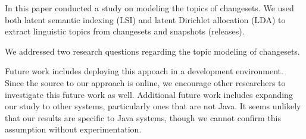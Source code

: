 
In this paper conducted a study on modeling the topics of changesets.
We used both latent semantic indexing (LSI) and latent Dirichlet
allocation (LDA) to extract linguistic topics from changesets and
snapshots (releases).

We addressed two research questions regarding the topic modeling of changesets.


Future work includes deploying this appoach in a development environment.
Since the source to our approach is online, we encourage other researchers
to investigate this future work as well.
Additional future work includes expanding our study to other systems,
particularly ones that are not Java.
It seems unlikely that our results are specific to Java systems, 
though we cannot confirm this assumption without experimentation.
